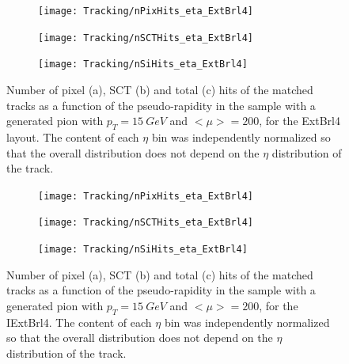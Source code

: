 \documentclass[a4paper,twoside,12pt]{article}
\begin{document}
\begin{figure}
\begin{subfigure}{\linewidth}
\centering
\texttt{[image: Tracking/nPixHits\_eta\_ExtBrl4]}
\caption{}
\label{fig:tracking:nPixHits_eta_ExtBrl4}
\end{subfigure}

\begin{subfigure}{\linewidth}
\centering
\texttt{[image: Tracking/nSCTHits\_eta\_ExtBrl4]}
\caption{}
\label{fig:tracking:nSCTHits_eta_ExtBrl4}
\end{subfigure}

\begin{subfigure}{\linewidth}
\centering
\texttt{[image: Tracking/nSiHits\_eta\_ExtBrl4]}
\caption{}
\label{fig:tracking:nSiHits_eta_ExtBrl4}
\end{subfigure}
\caption{Number of pixel (a), SCT (b) and total (c) hits of the matched tracks as a function of the pseudo-rapidity in the sample with a generated pion with $p_{T} = 15\ GeV$ and $<\mu> = 200$, for the ExtBrl4 layout. The content of each $\eta$ bin was independently normalized so that the overall distribution does not depend on the $\eta$ distribution of the track.}
\label{fig:tracking:nHits_eta_ExtBrl4}
\end{figure}

\begin{figure}
\begin{subfigure}{\linewidth}
\centering
\texttt{[image: Tracking/nPixHits\_eta\_ExtBrl4]}
\caption{}
\label{fig:tracking:nPixHits_eta_IExtBrl4}
\end{subfigure}

\begin{subfigure}{\linewidth}
\centering
\texttt{[image: Tracking/nSCTHits\_eta\_ExtBrl4]}
\caption{}
\label{fig:tracking:nSCTHits_eta_IExtBrl4}
\end{subfigure}

\begin{subfigure}{\linewidth}
\centering
\texttt{[image: Tracking/nSiHits\_eta\_ExtBrl4]}
\caption{}
\label{fig:tracking:nSiHits_eta_IExtBrl4}
\end{subfigure}
\caption{Number of pixel (a), SCT (b) and total (c) hits of the matched tracks as a function of the pseudo-rapidity in the sample with a generated pion with $p_{T} = 15\ GeV$ and $<\mu> = 200$, for the IExtBrl4. The content of each $\eta$ bin was independently normalized so that the overall distribution does not depend on the $\eta$ distribution of the track.}
\label{fig:tracking:nHits_eta_IExtBrl4}
\end{figure}
\end{document}
